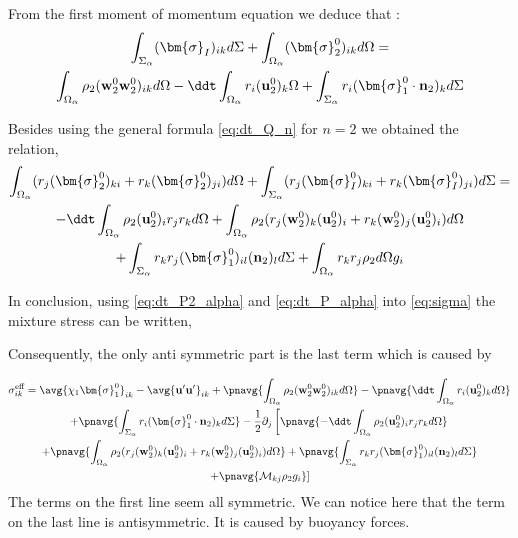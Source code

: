 From the first  moment of momentum equation we deduce that : 
\begin{multline}
    \int_{\Sigma_\alpha} 
    (\bm{\sigma}_I)_{ik}
    d\Sigma
    +\int_{\Omega_\alpha} 
    (\bm{\sigma}_2^0)_{ik}
    d\Omega
    = \\
    \int_{\Omega_\alpha} \rho_2 
    (\textbf{w}_2^0\textbf{w}_2^0  )_{ik}
    d\Omega
    -\ddt \int_{\Omega_\alpha} r_i (\textbf{u}^0_2)_k \Omega
    +\int_{\Sigma_\alpha} 
     r_i (\bm{\sigma}_1^0 \cdot \textbf{n}_2)_{k}
    d\Sigma
    \label{eq:dt_P_alpha}
\end{multline}

Besides using the general formula \ref{eq:dt_Q_n} for $n = 2$ we obtained the relation, 
\begin{multline}
    \int_{\Omega_\alpha} (r_{j}(\bm{\sigma}^0_2)_{ki}+r_{k}(\bm{\sigma}^0_2)_{ji})d\Omega
    +\int_{\Sigma_\alpha} (r_{j}(\bm{\sigma}^0_I)_{ki}+r_{k}(\bm{\sigma}_I^0)_{ji})d\Sigma
    = \\
    - \ddt\int_{\Omega_\alpha} \rho_2 (\textbf{u}_2^0)_i r_j r_k d\Omega
    + \int_{\Omega_\alpha} \rho_2 (r_{j} (\textbf{w}_2^0)_k (\textbf{u}^0_2)_i + r_k (\textbf{w}_2^0)_j (\textbf{u}^0_2)_i)d\Omega\\
    +\int_{\Sigma_\alpha}  r_{k}r_{j} (\bm{\sigma}_1^0)_{il} (\textbf{n}_2)_l d\Sigma
    + \int_{\Omega_\alpha} r_{k}r_{j}  \rho_2 d\Omega g_i
    \label{eq:dt_P2_alpha}
\end{multline}

In conclusion, using \ref{eq:dt_P2_alpha} and \ref{eq:dt_P_alpha} into \ref{eq:sigma} the mixture stress can be written,

Consequently, the only anti symmetric part is the last term which is caused by

\begin{multline*}
    \sigma_{ik}^\text{eff}
    = \avg{\chi_1 \bm{\sigma}^0_1}_{ik} 
    - \avg{\textbf{u}'\textbf{u}'}_{ik}
    + \pnavg{\int_{\Omega_\alpha} \rho_2 
    (\textbf{w}_2^0\textbf{w}_2^0  )_{ik}
    d\Omega}
    -\pnavg{\ddt \int_{\Omega_\alpha} r_i (\textbf{u}^0_2)_k d\Omega}\\
    +\pnavg{\int_{\Sigma_\alpha} 
     r_i (\bm{\sigma}_1^0 \cdot \textbf{n}_2)_{k}
    d\Sigma}
    - \frac{1}{2}\partial_j \left[\pnavg{
        - \ddt\int_{\Omega_\alpha} \rho_2 (\textbf{u}_2^0)_i r_j r_k d\Omega}
        \right. \\ \left.
            + \pnavg{\int_{\Omega_\alpha} \rho_2 (r_{j} (\textbf{w}_2^0)_k (\textbf{u}^0_2)_i + r_k (\textbf{w}_2^0)_j (\textbf{u}^0_2)_i)d\Omega} 
            + \pnavg{
                \int_{\Sigma_\alpha}  r_{k}r_{j} (\bm{\sigma}_1^0)_{il} (\textbf{n}_2)_l d\Sigma}
                \right. \\ \left.
                + \pnavg{\mathcal{M}_{kj}  \rho_2  g_i}
    \right]
\end{multline*}
The terms on the first line seem all symmetric. 
We can notice here that the term on the last line is antisymmetric. 
It is caused by buoyancy forces. 



